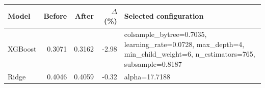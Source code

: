 \begin{tabular}{@{}lrrr>{\raggedright\arraybackslash}p{7.2cm}@{}}
\toprule
Model & Before & After & $\Delta$ (\%) & Selected configuration \\
\midrule
XGBoost & 0.3071 & 0.3162 & -2.98 & colsample\_bytree=0.7035, learning\_rate=0.0728, max\_depth=4, min\_child\_weight=6, n\_estimators=765, subsample=0.8187 \\
Ridge & 0.4046 & 0.4059 & -0.32 & alpha=17.7188 \\
\bottomrule
\end{tabular}
